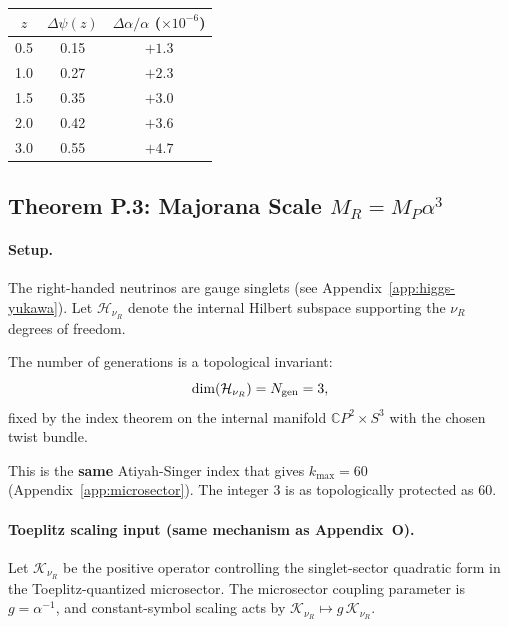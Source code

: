 \begin{center}
\begin{tabular}{ccc}
\toprule
$z$ & $\Delta\psi(z)$ & $\Delta\alpha/\alpha$ ($\times 10^{-6}$) \\
\midrule
0.5 & 0.15 & $+1.3$ \\
1.0 & 0.27 & $+2.3$ \\
1.5 & 0.35 & $+3.0$ \\
2.0 & 0.42 & $+3.6$ \\
3.0 & 0.55 & $+4.7$ \\
\bottomrule
\end{tabular}
\end{center}

\subsection{Theorem P.3: Majorana Scale $M_R = M_P\alpha^3$}\label{sec:P_MR}

\paragraph{Setup.}
The right-handed neutrinos are gauge singlets (see Appendix~\ref{app:higgs-yukawa}).
Let $\mathcal{H}_{\nu_R}$ denote the internal Hilbert subspace supporting the $\nu_R$ degrees of freedom.

\begin{lemma}\label{lem:P_Ngen}
The number of generations is a topological invariant:
\begin{equation}
\dim(\mathcal{H}_{\nu_R}) = N_{\rm gen}=3,
\end{equation}
fixed by the index theorem on the internal manifold $\mathbb{C}P^2\times S^3$ with the chosen twist bundle.
\end{lemma}

This is the \textbf{same} Atiyah-Singer index that gives $k_{\max} = 60$ (Appendix~\ref{app:microsector}).
The integer 3 is as topologically protected as 60.

\paragraph{Toeplitz scaling input (same mechanism as Appendix~O).}
Let $\mathcal{K}_{\nu_R}$ be the positive operator controlling the singlet-sector quadratic form in the 
Toeplitz-quantized microsector.
The microsector coupling parameter is $g=\alpha^{-1}$, and constant-symbol scaling acts by 
$\mathcal{K}_{\nu_R}\mapsto g\,\mathcal{K}_{\nu_R}$.

